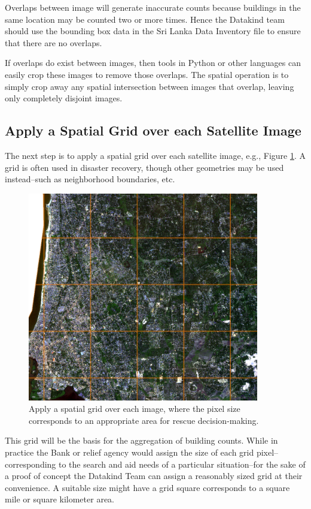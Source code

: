 \documentclass[12pt, a4paper, oneside, headinclude, footinclude]{article}
\begin{document}
Overlaps between image will generate inaccurate counts because buildings in the same location may be counted two or more times. Hence the Datakind team should use the bounding box data in the Sri Lanka Data Inventory file to ensure that there are no overlaps. 

If overlaps do exist between images, then tools in Python or other languages can
easily crop these images to remove those overlaps. The spatial operation is to
simply crop away any spatial intersection between images that overlap, leaving
only completely disjoint images. 

\subsection{Apply a Spatial Grid over each Satellite Image}

The next step is to apply a spatial grid over each satellite image, e.g., Figure \ref{fig:biggrid}. A grid is often used in disaster recovery, though other geometries may be used instead--such as neighborhood boundaries, etc.

\begin{figure}
	\centering
    \includegraphics[width=0.9\textwidth]{images/negambo_with_clipped_grid_full.png}
    \caption[Creating a spatial grid] {Apply a spatial grid over each image,
      where the pixel size corresponds to an appropriate area for rescue
      decision-making.}
    \label{fig:biggrid}
  \end{figure}

This grid will be the basis for the aggregation of building counts. While in
practice the Bank or relief agency would assign the size of each grid
pixel--corresponding to the search and aid needs of a particular situation--for
the sake of a proof of concept the Datakind Team can assign a reasonably sized
grid at their convenience. A suitable size might have a grid square corresponds
to a square mile or square kilometer area. 
\end{document}
